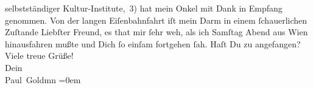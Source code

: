 \begin{ledgroupsized}[t]{13cm}
{{{                     selbstständiger Kultur-Institute, 3)}}}\label{K_L02891-3h} hat mein Onkel mit
               Dank in Empfang genommen.\pend
           \pstart
           Von der langen Eiſenbahnfahrt iſt mein Darm in einem ſchauerlichen Zuſtande{\dotsseven}\pend
           \pstart
           Liebſter Freund, es that mir ſehr weh, als ich Samſtag{ }Abend aus Wien hinausfahren mußte und
               Dich ſo einſam fortgehen ſah. Haſt Du zu \label{K_L02891-5v}\label{K_L02891-5h} angefangen?\pend
           \pstart
           Viele treue Grüße! {\\[\baselineskip]}Dein {\\[\baselineskip]}\spacefill\mbox{Paul Goldmn}\pend
           \leftskip=0em{}
         
         \endnumbering{}\end{ledgroupsized}  \newcommand{\dateiname}{L02891}\newcommand{\titel}{Paul Goldmann an Arthur Schnitzler, 23. 10. [1899]}\newcommand{\editorInnen}{Martin Anton Müller und Laura Untner}
      